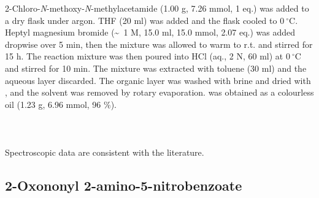 {{{{{{{2-Chloro-\textit{N}-methoxy-\textit{N}-methylacetamide  (1.00 g, 7.26 mmol, 1 eq.) was added to a dry flask under argon. THF (20 ml) was added and the flask cooled to $0\ ^{\circ}$C. Heptyl magnesium bromide  (\textasciitilde ~1 M, 15.0 ml, 15.0 mmol, 2.07 eq.) was added dropwise over 5 min, then the mixture was allowed to warm to r.t. and stirred for 15 h. The reaction mixture was then poured into HCl (aq., 2 N, 60 ml) at $0\ ^{\circ}$C and stirred for 10 min. The mixture was extracted with toluene (30 ml) and the aqueous layer discarded. The organic layer was washed with brine and dried with , and the solvent was removed by rotary evaporation.  was obtained as a colourless oil (1.23 g, 6.96 mmol, 96 \%).
\\[1\baselineskip]
\\[1\baselineskip]
\\[1\baselineskip]
\\[1\baselineskip]
Spectroscopic data are consistent with the literature\cite{Hodgkinson2011}.


\subsection{2-Oxononyl 2-amino-5-nitrobenzoate }

}}}}}}}
